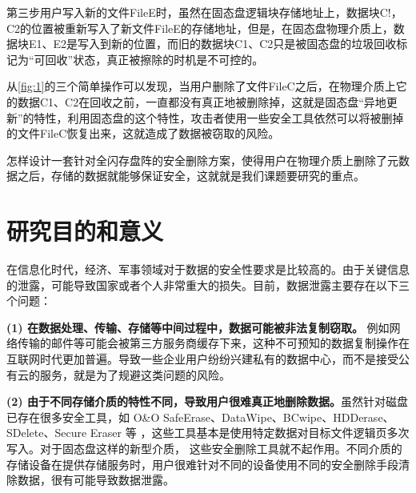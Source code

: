 第三步用户写入新的文件FileE时，虽然在固态盘逻辑块存储地址上，数据块C!，C2的位置被重新写入了新文件FileE的存储地址，但是，在固态盘物理介质上，数据块E1、E2是写入到新的位置，而旧的数据块C1、C2只是被固态盘的垃圾回收标记为“可回收”状态，真正被擦除的时机是不可控的。


从\autoref{fig:1}的三个简单操作可以发现，当用户删除了文件FileC之后，在物理介质上它的数据C1、C2在回收之前，一直都没有真正地被删除掉，这就是固态盘“异地更新”的特性，利用固态盘的这个特性，攻击者使用一些安全工具依然可以将被删掉的文件FileC恢复出来，这就造成了数据被窃取的风险。


怎样设计一套针对全闪存盘阵的安全删除方案，使得用户在物理介质上删除了元数据之后，存储的数据就能够保证安全，这就就是我们课题要研究的重点。
\section{研究目的和意义}
在信息化时代，经济、军事领域对于数据的安全性要求是比较高的。由于关键信息的泄露，可能导致国家或者个人非常重大的损失。目前，数据泄露主要存在以下三个问题：


\textbf{(1) 在数据处理、传输、存储等中间过程中，数据可能被非法复制窃取。}
例如网络传输的邮件等可能会被第三方服务商缓存下来，这种不可预知的数据复制操作在互联网时代更加普遍。导致一些企业用户纷纷兴建私有的数据中心，而不是接受公有云的服务，就是为了规避这类问题的风险。


\textbf{(2) 由于不同存储介质的特性不同，导致用户很难真正地删除数据。}虽然针对磁盘已存在很多安全工具，如 O\&O SafeErase、DataWipe、BCwipe、HDDerase、SDelete、Secure Eraser 等\cite{safe-erase,secure-eraser,bcwipe} ，这些工具基本是使用特定数据对目标文件逻辑页多次写入。对于固态盘这样的新型介质， 这些安全删除工具就不起作用。不同介质的存储设备在提供存储服务时，用户很难针对不同的设备使用不同的安全删除手段清除数据，很有可能导致数据泄露。



